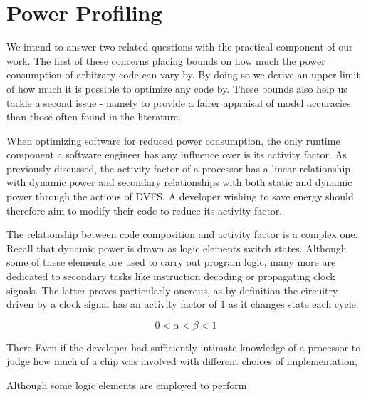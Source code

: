 \section{Power Profiling}
\label{sec:profiling}

We intend to answer two related questions with the practical component of our work. The first of these concerns placing bounds on how much the power consumption of arbitrary code can vary by. By doing so we derive an upper limit of how much it is possible to optimize any code by. These bounds also help us tackle a second issue - namely to provide a fairer appraisal of model accuracies than those often found in the literature.

When optimizing software for reduced power consumption, the only runtime component a software engineer has any influence over is its activity factor. As previously discussed, the activity factor of a processor has a linear relationship with dynamic power and secondary relationships with both static and dynamic power through the actions of DVFS. A developer wishing to save energy should therefore aim to modify their code to reduce its activity factor.

The relationship between code composition and activity factor is a complex one. Recall that dynamic power is drawn as logic elements switch states. Although some of these elements are used to carry out program logic, many more are dedicated to secondary tasks like instruction decoding or propagating clock signals. The latter proves particularly onerous, as by definition the circuitry driven by a clock signal has an activity factor of 1 as it changes state each cycle.\findref


\begin{equation}
0 < \alpha < \beta < 1
\end{equation}







There 
Even if the developer had sufficiently intimate knowledge of a processor to judge how much of a chip was involved with different choices of implementation, 




Although some logic elements are employed to perform 

